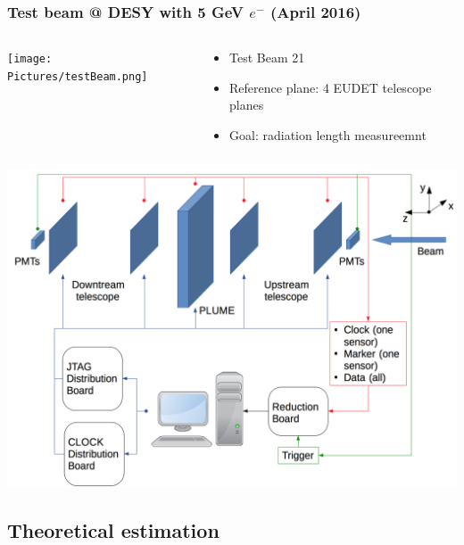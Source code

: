 \documentclass{beamer}
\begin{document}
    \begin{frame}
      \frametitle{Test beam @ DESY with 5 GeV $e^-$ (April 2016)}
      
      \begin{columns}[c]
        \begin{column}{5cm}
          \begin{center}
            \texttt{[image: Pictures/testBeam.png]}
          \end{center}
        \end{column}
        \begin{column}{5cm}
          \begin{itemize}
            \item Test Beam 21
            \item Reference plane: 4 EUDET telescope planes
            \item Goal: radiation length measureemnt
          \end{itemize}
        \end{column}
      \end{columns}
    \end{frame}

    \begin{frame}

      \begin{center}
        \includegraphics[width = \textwidth]{Pictures/testBeamAcquisition.png}
      \end{center}
    \end{frame}

    \subsection{Theoretical estimation}
    
\end{document}
